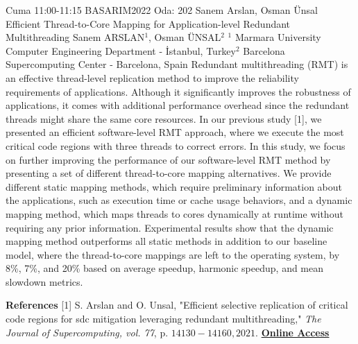 
    \begin{abstract_basarim}
    {Cuma 11:00-11:15}
    {BASARIM2022}
    {Oda: 202}
    {Sanem Arslan, Osman Ünsal}
    {Efficient Thread-to-Core Mapping for Application-level Redundant Multithreading}
    {%
    Sanem ARSLAN$^{1}$, Osman ÜNSAL$^{2}$}
    {%
    }
    {%
    $^1$ Marmara University Computer Engineering Department - İstanbul, Turkey\newline{}$^2$ Barcelona Supercomputing Center - Barcelona, Spain}
    Redundant multithreading (RMT) is an effective thread-level replication method to improve the reliability requirements of applications. Although it significantly improves the robustness of applications, it comes with additional performance overhead since the redundant threads might share the same core resources. In our previous study [1], we presented an efficient software-level RMT approach, where we execute the most critical code regions with three threads to correct errors. In this study, we focus on further improving the performance of our software-level RMT method by presenting a set of different thread-to-core mapping alternatives. We provide different static mapping methods, which require preliminary information about the applications, such as execution time or cache usage behaviors, and a dynamic mapping method, which maps threads to cores dynamically at runtime without requiring any prior information. Experimental results show that the dynamic mapping method outperforms all static methods in addition to our baseline model, where the thread-to-core mappings are left to the operating system, by 8\%, 7\%, and 20\% based on average speedup, harmonic speedup, and mean slowdown metrics. 
    
            \textbf{References} \newline{}[1] S. Arslan and O. Unsal, "Efficient selective replication of critical code regions for sdc mitigation leveraging redundant multithreading," \textit{The Journal of Supercomputing, vol. 77}, p. $14130-14160,2021$.
     \newline\newline\noindent \href{https://drive.google.com/file/d/1L2YXk26Ol0Ns1RC6ZMFP_ZEIi01lXOz9/view?usp=drivesdk}{\bfseries Online Access}
    \end{abstract_basarim}
    
